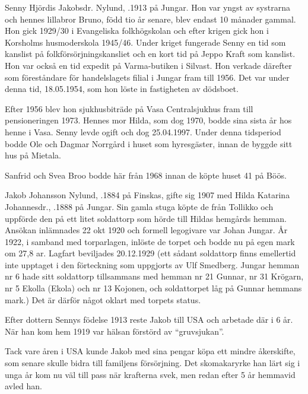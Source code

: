 
%
Senny Hjördis Jakobsdr. Nylund, .1913 på Jungar. Hon var yngst av systrarna och hennes lillabror Bruno, född tio år senare, blev endast 10 månader gammal. Hon gick 1929/30 i Evangeliska folkhögskolan och efter krigen gick hon i Korsholms husmoderskola 1945/46. Under kriget fungerade Senny en tid som kanslist på folkförsörjningskansliet och en kort tid på Jeppo Kraft som kanslist. Hon var också en tid expedit på Varma-butiken i Silvast. Hon verkade därefter som föreståndare för handelslagets filial i Jungar fram till 1956. Det var under denna tid, 18.05.1954, som hon löste in fastigheten av dödsboet.

Efter 1956 blev hon sjukhusbiträde på Vasa Centralsjukhus fram till pensioneringen 1973. Hennes mor Hilda, som dog 1970, bodde sina sista år hos henne i Vasa. Senny levde ogift och  dog  25.04.1997. Under denna tidsperiod bodde Ole och Dagmar Norrgård i huset som hyresgäster, innan de byggde sitt hus på Mietala.

Sanfrid och Svea Broo bodde här från 1968 innan de köpte huset 41 på Böös.


%
Jakob Johansson Nylund, .1884 på Finskas, gifte sig 1907 med Hilda Katarina Johannesdr., .1888 på Jungar. Sin gamla stuga köpte de från Tollikko och uppförde den på ett litet soldattorp som hörde till Hildas hemgårds hemman. Ansökan inlämnades 22 okt 1920 och formell legogivare var Johan Jungar. År 1922, i samband med torparlagen, inlöste de torpet och bodde nu på egen mark om 27,8 ar. Lagfart beviljades 20.12.1929 (ett sådant soldattorp finns emellertid inte upptaget i den förteckning som uppgjorts av Ulf Smedberg. Jungar hemman nr 6 hade sitt soldattorp tillsammans med hemman nr 21 Gunnar, nr 31 Krögarn, nr 5 Ekolla (Ekola) och nr 13 Kojonen, och soldattorpet  låg på Gunnar hemmans mark.) Det är därför något oklart med torpets status.

Efter dottern Sennys födelse 1913 reste Jakob till USA och arbetade där i 6 år. När han kom hem 1919 var hälsan förstörd av ``gruvsjukan''.

Tack vare åren i USA kunde Jakob med sina pengar köpa ett mindre åkerskifte, som senare skulle bidra till familjens försörjning. Det skomakaryrke han lärt sig i unga år kom nu väl till pass när krafterna svek, men redan efter 5 år hemmavid avled han.

